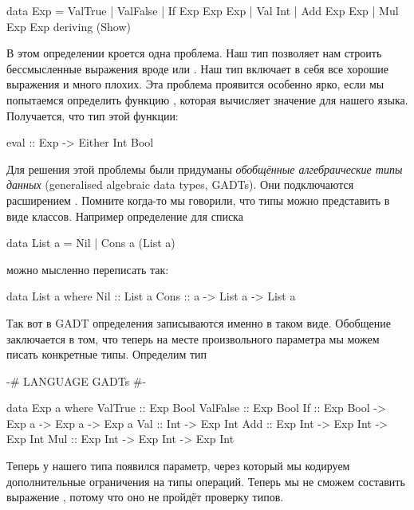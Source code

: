 \begin{code}
data Exp = ValTrue
         | ValFalse
         | If Exp Exp Exp
         | Val Int
         | Add Exp Exp
         | Mul Exp Exp
         deriving (Show)
\end{code}

В этом определении кроется одна проблема. Наш тип позволяет нам строить
бессмысленные выражения вроде  или
. Наш тип  включает в себя все
хорошие выражения и много плохих. Эта проблема проявится особенно ярко,
если мы попытаемся определить функцию , которая вычисляет
значение для нашего языка. Получается, что тип этой функции:


\begin{code}
eval :: Exp -> Either Int Bool
\end{code}

 Для решения этой
проблемы были придуманы \emph{обобщённые алгебраические типы данных}
(generalised algebraic data types, GADTs). Они подключаются расширением
. Помните когда-то мы говорили, что типы можно представить в
виде классов. Например определение для списка


\begin{code}
data List a = Nil | Cons a (List a)
\end{code}

\noindent 

можно мысленно переписать так:


\begin{code}
data List a where
    Nil  :: List a
    Cons :: a -> List a -> List a
\end{code}

Так вот в GADT определения записываются именно в таком виде. Обобщение
заключается в том, что теперь на месте произвольного параметра  мы
можем писать конкретные типы. Определим тип 


\begin{code}
{-# LANGUAGE GADTs #-}

data Exp a where
    ValTrue     :: Exp Bool
    ValFalse    :: Exp Bool
    If          :: Exp Bool -> Exp a -> Exp a -> Exp a
    Val         :: Int -> Exp Int
    Add         :: Exp Int -> Exp Int -> Exp Int
    Mul         :: Exp Int -> Exp Int -> Exp Int
\end{code}

Теперь у нашего типа  появился параметр, через который мы
кодируем дополнительные ограничения на типы операций. Теперь мы не
сможем составить выражение , потому что оно не
пройдёт проверку типов.

